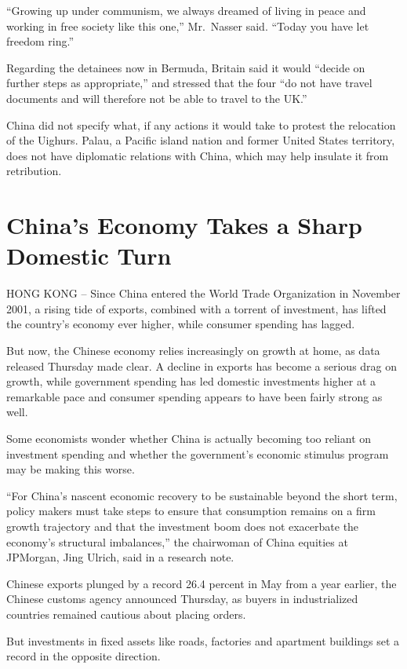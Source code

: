 ﻿\documentclass[12pt,a4paper,onecolumn]{article}
\begin{document}
``Growing up under communism, we always dreamed of living in peace and working in free society like
this one,'' Mr.~Nasser said. ``Today you have let freedom ring.''

Regarding the detainees now in Bermuda, Britain said it would ``decide on further steps as
appropriate,'' and stressed that the four ``do not have travel documents and will therefore not be
able to travel to the UK.''

China did not specify what, if any actions it would take to protest the relocation of the Uighurs.
Palau, a Pacific island nation and former United States territory, does not have diplomatic
relations with China, which may help insulate it from retribution.

\section{China's Economy Takes a Sharp Domestic Turn}

HONG KONG -- Since China entered the World Trade Organization in November 2001, a rising tide of
exports, combined with a torrent of investment, has lifted the country's economy ever higher, while
consumer spending has lagged.

But now, the Chinese economy relies increasingly on growth at home, as data released Thursday made
clear. A decline in exports has become a serious drag on growth, while government spending has led
domestic investments higher at a remarkable pace and consumer spending appears to have been fairly
strong as well.

Some economists wonder whether China is actually becoming too reliant on investment spending and
whether the government's economic stimulus program may be making this worse.

``For China's nascent economic recovery to be sustainable beyond the short term, policy makers must
take steps to ensure that consumption remains on a firm growth trajectory and that the investment
boom does not exacerbate the economy's structural imbalances,'' the chairwoman of China equities at
JPMorgan, Jing Ulrich, said in a research note.

Chinese exports plunged by a record 26.4 percent in May from a year earlier, the Chinese customs
agency announced Thursday, as buyers in industrialized countries remained cautious about placing
orders.

But investments in fixed assets like roads, factories and apartment buildings set a record in the
opposite direction.
\end{document}
